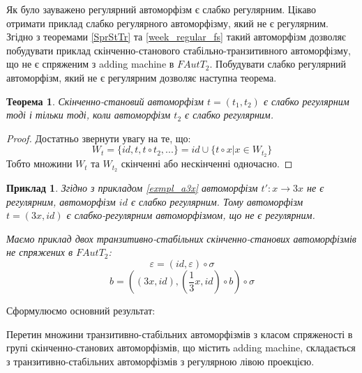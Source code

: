 \documentclass[a4paper,12pt]{article} \usepackage{a4wide}
\numberwithin{equation}{subsection}
\newtheorem{theorem}{Теорема}[subsection]
\newtheorem{example}{Приклад}[subsection]
\begin{document}
Як було зауважено регулярний автоморфізм є слабко регулярним. Цікаво
отримати приклад слабко регулярного автоморфізму, який не є
регулярним. Згідно з теоремами \ref{SprStTr} та \ref{week_regular_fs}
такий автоморфізм дозволяє побудувати приклад скінченно-станового
стабільно-транзитивного автоморфізму, що не є спряженим з adding
machine в $FAutT_2$. Побудувати слабко регулярний автоморфізм, який не
є регулярним дозволяє наступна теорема.

\begin{theorem}
  \label{week_regular}
  Скінченно-становий автоморфізм $t=(t_1,t_2)$ є слабко регулярним
  тоді і тільки тоді, коли автоморфізм $t_2$ є слабко регулярним.
\end{theorem}
\begin{proof}
  Достатньо звернути увагу на те, що:
$$ W_t=\{id,t, t\circ t_2,...\} = id \cup \{t\circ x | x \in W_{t_2}\}$$
Тобто множини $W_t$ та $W_{t_2}$ скінченні або нескінченні одночасно.
\end{proof}

    


  \begin{example}
    Згідно з прикладом \ref{exmpl_a3x} автоморфізм $t':x \rightarrow
    3x$ не є регулярним, автоморфізм $id$ є слабко регулярним. Тому
    автоморфізм $t = (3x, id)$ є слабко-регулярним автоморфізмом, що
    не є регулярним.

    Маємо приклад двох транзитивно-стабільних скінченно-станових
    автоморфізмів не спряжених в $FAutT_2$:
$$\varepsilon=(id,\varepsilon)\circ \sigma$$
$$b=((3x,id),(\frac{1}{3}x,id)\circ b)\circ \sigma$$

  \end{example}
  Сформулюємо основний результат:

  Перетин множини транзитивно-стабільних автоморфізмів з класом
  спряженості в групі скінченно-станових автоморфізмів, що містить
  adding machine, складається з транзитивно-стабільних автоморфізмів з
  регулярною лівою проекцією.
\end{document}
